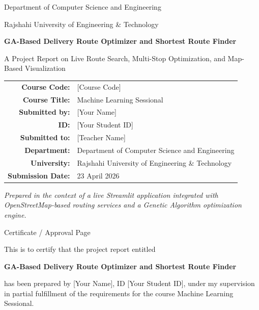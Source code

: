 \begin{titlepage}
\centering
{\Large Department of Computer Science and Engineering\par}
{\Large Rajshahi University of Engineering \& Technology\par}
\vspace{1.5cm}
{\huge\bfseries GA-Based Delivery Route Optimizer and Shortest Route Finder\par}
\vspace{0.75cm}
{\large A Project Report on Live Route Search, Multi-Stop Optimization, and Map-Based Visualization\par}
\vspace{1.5cm}
\begin{tabular}{rl}
\textbf{Course Code:} & \textnormal{[Course Code]} \\
\textbf{Course Title:} & Machine Learning Sessional \\
\textbf{Submitted by:} & \textnormal{[Your Name]} \\
\textbf{ID:} & \textnormal{[Your Student ID]} \\
\textbf{Submitted to:} & \textnormal{[Teacher Name]} \\
\textbf{Department:} & Department of Computer Science and Engineering \\
\textbf{University:} & Rajshahi University of Engineering \& Technology \\
\textbf{Submission Date:} & 23 April 2026 \\
\end{tabular}
\vfill
{\large \textit{Prepared in the context of a live Streamlit application integrated with OpenStreetMap-based routing services and a Genetic Algorithm optimization engine.}\par}
\end{titlepage}

\newpage
\thispagestyle{empty}
\begin{center}
{\Large Certificate / Approval Page\par}
\vspace{1.25cm}
This is to certify that the project report entitled\par
\vspace{0.5cm}
{\bfseries GA-Based Delivery Route Optimizer and Shortest Route Finder}\par
\vspace{0.5cm}
has been prepared by [Your Name], ID [Your Student ID], under my supervision in partial fulfillment of the requirements for the course Machine Learning Sessional.
\vspace{1.5cm}
\end{center}

